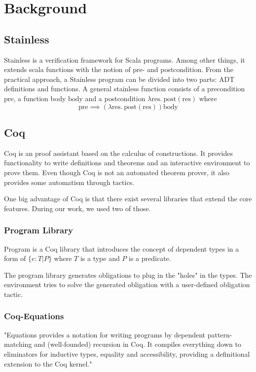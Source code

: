 \section{Background}

\subsection{Stainless}

Stainless is a verification framework for Scala programs. Among other things, it extends scala functions with the notion of pre- and postcondition. From the practical approach, a Stainless program can be divided into two parts: ADT definitions and functions. A general stainless function consists of a precondition $\text{pre}$, a function body $\text{body}$ and a postcondition $\lambda  \text{res}. ~\text{post}( \text{res})$ where $$\text{pre} \implies (\lambda  \text{res}. ~\text{post}( \text{res})) \text{body}$$

\subsection{Coq}

Coq is an proof assistant based on the calculus of constructions. It provides functionality to write definitions and theorems and an interactive environment to prove them. Even though Coq is not an automated theorem prover, it also provides some automatism through tactics.

One big advantage of Coq is that there exist several libraries that extend the core features. During our work, we used two of those.

\subsubsection{Program Library}

Program is a Coq library that introduces the concept of dependent types in a form of $\{e: T | P\}$ where $T$ is a type and $P$ is a predicate. 

The program library generates obligations to plug in the "holes" in the types. The environment tries to solve the generated obligation with a user-defined obligation tactic.


\subsubsection{Coq-Equations}
"Equations provides a notation for writing programs by dependent pattern-matching and (well-founded) recursion in Coq. It compiles everything down to eliminators for inductive types, equality and accessibility, providing a definitional extension to the Coq kernel."

